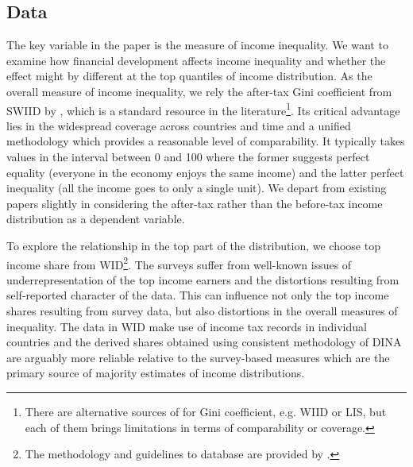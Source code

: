 \begin{refsection}

%
%
%
%
%

\section{Data}
The key variable in the paper is the measure of income inequality. We want to examine how financial development affects income inequality and whether the effect might by different at the top quantiles of income distribution. As the overall measure of income inequality, we rely the after-tax Gini coefficient from \ac{SWIID} by \textcite{Solt2019}, which is a standard resource in the literature\footnote{There are alternative sources of for Gini coefficient, e.g. \ac{WIID} or \ac{LIS}, but each of them brings limitations in terms of comparability or coverage.}. Its critical advantage lies in the widespread coverage across countries and time and a unified methodology which provides a reasonable level of comparability. It typically takes values in the interval between 0 and 100 where the former suggests perfect equality (everyone in the economy enjoys the same income) and the latter perfect inequality (all the income goes to only a single unit). We depart from existing papers slightly in considering the after-tax rather than the before-tax income distribution as a dependent variable. 

To explore the relationship in the top part of the distribution, we choose top income share from \ac{WID}\footnote{The methodology and guidelines to database are provided by \textcite{alvaredo2016distributional}.}. The surveys suffer from well-known issues of underrepresentation of the top income earners and the distortions resulting from self-reported character of the data. This can influence not only the top income shares resulting from survey data, but also distortions in the overall measures of inequality. The data in \ac{WID} make use of income tax records in individual countries and the derived shares obtained using consistent methodology of \ac{DINA} are arguably more reliable relative to the survey-based measures which are the primary source of majority estimates of income distributions. 


\end{refsection}
